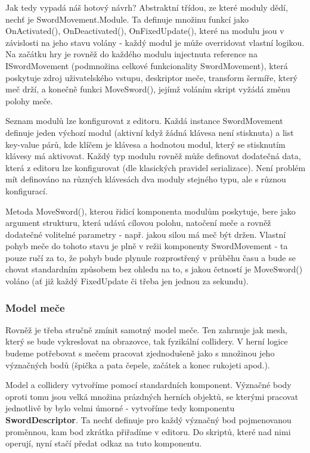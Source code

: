 Jak tedy vypadá náš hotový návrh? Abstraktní třídou, ze které moduly dědí, nechť je SwordMovement.Module. Ta definuje množinu funkcí jako OnActivated(), OnDeactivated(), OnFixedUpdate(), které na modulu jsou v závislosti na jeho stavu volány - každý modul je může overridovat vlastní logikou. Na začátku hry je rovněž do každého modulu injectnuta reference na ISwordMovement (podmnožina celkové funkcionality SwordMovement), která poskytuje zdroj uživatelského vstupu, deskriptor meče, transform šermíře, který meč drží, a konečně funkci MoveSword(), jejímž voláním skript vyžádá změnu polohy meče.

Seznam modulů lze konfigurovat z editoru. Každá instance SwordMovement definuje jeden výchozí modul (aktivní když žádná klávesa není stisknuta) a list key-value párů, kde klíčem je klávesa a hodnotou modul, který se stisknutím klávesy má aktivovat. Každý typ modulu rovněž může definovat dodatečná data, která z editoru lze konfigurovat (dle klasických pravidel serializace). Není problém mít definováno na různých klávesách dva moduly stejného typu, ale s různou konfigurací.

Metoda MoveSword(), kterou řidicí komponenta modulům poskytuje, bere jako argument strukturu, která udává cílovou polohu, natočení meče a rovněž dodatečné volitelné parametry - např. jakou silou má meč být držen. Vlastní pohyb meče do tohoto stavu je plně v režii komponenty SwordMovement - ta pouze ručí za to, že pohyb bude plynule rozprostřený v průběhu času a bude se chovat standardním způsobem bez ohledu na to, s jakou četností je MoveSword() voláno (ať již každý FixedUpdate či třeba jen jednou za sekundu).

\subsubsection*{Model meče}

Rovněž je třeba stručně zmínit samotný model meče. Ten zahrnuje jak mesh, který se bude vykreslovat na obrazovce, tak fyzikální collidery. V herní logice budeme potřebovat s mečem pracovat zjednodušeně jako s množinou jeho význačných bodů (špička a pata čepele, začátek a konec rukojeti apod.).

Model a collidery vytvoříme pomocí standardních komponent. Význačné body oproti tomu jsou velká množina prázdných herních objektů, se kterými pracovat jednotlivě by bylo velmi úmorné - vytvoříme tedy komponentu \textbf{SwordDescriptor}. Ta nechť definuje pro každý význačný bod pojmenovanou proměnnou, kam bod zkrátka přiřadíme v editoru. Do skriptů, které nad nimi operují, nyní stačí předat odkaz na tuto komponentu.


